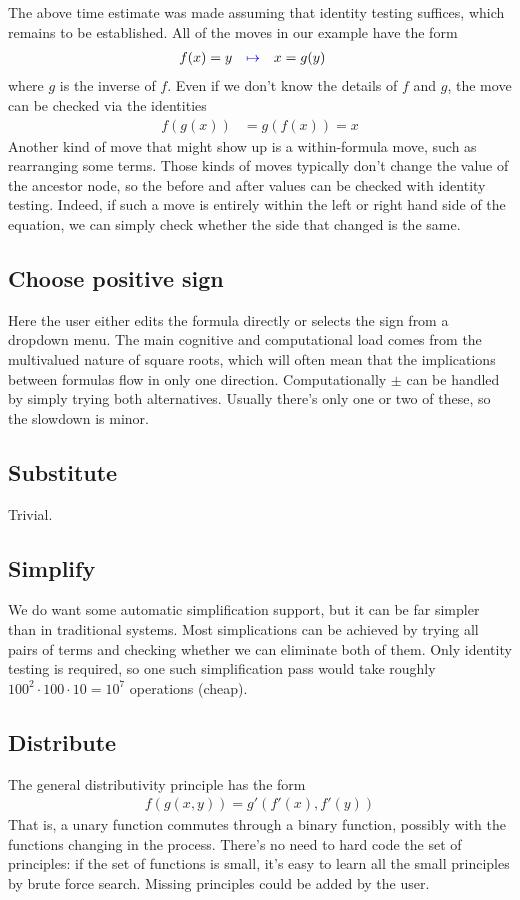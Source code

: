 \documentclass[11pt]{article}
\newcommand{\blue}[1]{{\color{blue} #1}}
\begin{document}
The above time estimate was made assuming that identity testing suffices, which remains to be established.
All of the moves in our example have the form
\begin{align*}
f(x) = y \quad&\blue{\mapsto}\quad x = g(y)
\end{align*}
where $g$ is the inverse of $f$.  Even if we don't know the details of $f$ and $g$, the move can be
checked via the identities
\begin{align*}
f(g(x)) &= g(f(x)) = x
\end{align*}
Another kind of move that might show up is a within-formula move, such as rearranging some terms.
Those kinds of moves typically don't change the value of the ancestor node, so the before and after
values can be checked with identity testing.  Indeed, if such a move is entirely within the left or
right hand side of the equation, we can simply check whether the side that changed is the same.

\subsection{\blue{Choose positive sign}}
Here the user either edits the formula directly or selects the sign
from a dropdown menu.  The main cognitive and computational load comes from the multivalued nature of
square roots, which will often mean that the implications between formulas flow in only one direction.
Computationally $\pm$ can be handled by simply trying both alternatives.  Usually there's only one or two
of these, so the slowdown is minor.

\subsection{\blue{Substitute}}
Trivial.

\subsection{\blue{Simplify}}
We do want some automatic simplification support, but it can be far simpler than
in traditional systems.  Most simplications can be achieved by trying all pairs of terms and checking
whether we can eliminate both of them.  Only identity testing is required, so one such simplification
pass would take roughly $100^2 \cdot 100 \cdot 10 = 10^7$ operations (cheap).

\subsection{\blue{Distribute}}
The general distributivity principle has the form
\begin{align*}
f(g(x,y)) = g'(f'(x),f'(y))
\end{align*}
That is, a unary function commutes through a binary function, possibly with the functions changing
in the process.  There's no need to hard code the set of principles: if the set of functions is small,
it's easy to learn all the small principles by brute force search.  Missing principles could be added
by the user.
\end{document}

